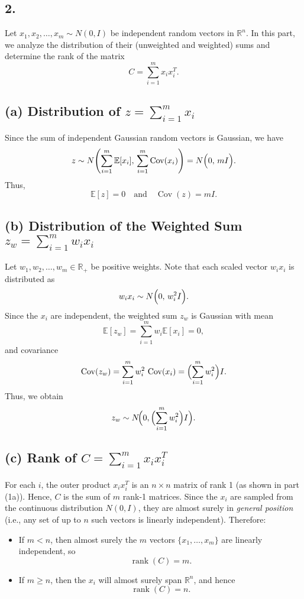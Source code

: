 \subsection*{2.}

Let $x_1, x_2, \dots, x_m \sim N(0,I)$ be independent random vectors in $\mathbb{R}^n$. In this part, we analyze the distribution of their (unweighted and weighted) sums and determine the rank of the matrix
\[
C = \sum_{i=1}^m x_i x_i^T.
\]

\subsection*{(a) Distribution of $z = \sum_{i=1}^m x_i$}
Since the sum of independent Gaussian random vectors is Gaussian, we have
\[
z \sim N\Biggl(\sum_{i=1}^m \mathbb{E}[x_i],\, \sum_{i=1}^m \operatorname{Cov}(x_i)\Biggr)
= N\Bigl(0,\, mI\Bigr).
\]
Thus, 
\[
\mathbb{E}[z] = 0 \quad \text{and} \quad \operatorname{Cov}(z) = mI.
\]

\subsection*{(b) Distribution of the Weighted Sum $z_w = \sum_{i=1}^m w_i x_i$}
Let $w_1, w_2, \dots, w_m \in \mathbb{R}_+$ be positive weights. Note that each scaled vector $w_i x_i$ is distributed as
\[
w_i x_i \sim N\Bigl(0,\, w_i^2 I\Bigr).
\]
Since the $x_i$ are independent, the weighted sum $z_w$ is Gaussian with mean
\[
\mathbb{E}[z_w] = \sum_{i=1}^m w_i \mathbb{E}[x_i] = 0,
\]
and covariance
\[
\operatorname{Cov}(z_w) = \sum_{i=1}^m w_i^2\, \operatorname{Cov}(x_i)
= \Bigl(\sum_{i=1}^m w_i^2\Bigr) I.
\]
Thus, we obtain
\[
z_w \sim N\!\Bigl(0, \Bigl(\sum_{i=1}^m w_i^2\Bigr) I\Bigr).
\]

\subsection*{(c) Rank of $C = \sum_{i=1}^m x_i x_i^T$}
For each $i$, the outer product $x_i x_i^T$ is an $n\times n$ matrix of rank 1 (as shown in part (1a)). Hence, $C$ is the sum of $m$ rank-1 matrices. Since the $x_i$ are sampled from the continuous distribution $N(0,I)$, they are almost surely in \emph{general position} (i.e., any set of up to $n$ such vectors is linearly independent). Therefore:
\begin{itemize}
    \item If $m < n$, then almost surely the $m$ vectors $\{x_1, \dots, x_m\}$ are linearly independent, so
    \[
    \operatorname{rank}(C)=m.
    \]
    \item If $m \ge n$, then the $x_i$ will almost surely span $\mathbb{R}^n$, and hence
    \[
    \operatorname{rank}(C)=n.
    \]
\end{itemize}
